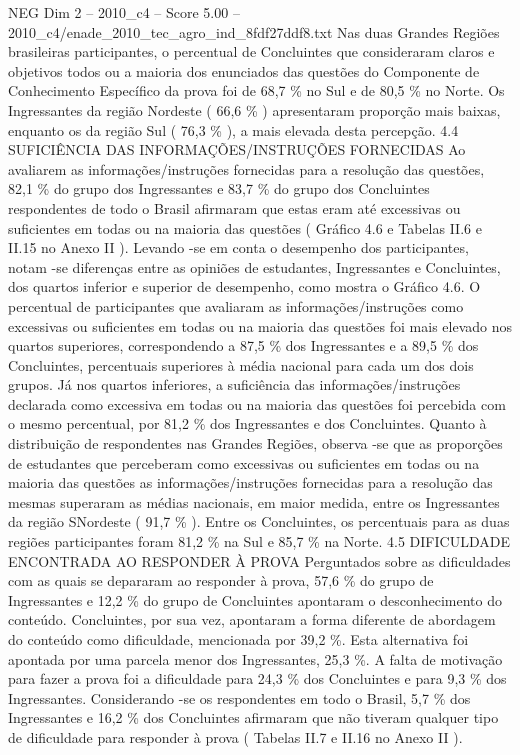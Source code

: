\begin{textsample}{NEG Dim 2 – 2010\_c4 – Score 5.00 – 2010\_c4/enade\_2010\_tec\_agro\_ind\_8fdf27ddf8.txt}
Nas duas Grandes Regiões brasileiras participantes, o percentual de Concluintes que consideraram claros e objetivos todos ou a maioria dos enunciados das questões do Componente de Conhecimento Específico da prova foi de 68,7 \% no Sul e de 80,5 \% no Norte.
Os Ingressantes da região Nordeste ( 66,6 \% ) apresentaram proporção mais baixas, enquanto os da região Sul ( 76,3 \% ), a mais elevada desta percepção. 4.4 SUFICIÊNCIA DAS INFORMAÇÕES/INSTRUÇÕES FORNECIDAS Ao avaliarem as informações/instruções fornecidas para a resolução das questões, 82,1 \% do grupo dos Ingressantes e 83,7 \% do grupo dos Concluintes respondentes de todo o Brasil afirmaram que estas eram até excessivas ou suficientes em todas ou na maioria das questões ( Gráfico 4.6 e Tabelas II.6 e II.15 no Anexo II ).
Levando -se em conta o desempenho dos participantes, notam -se diferenças entre as opiniões de estudantes, Ingressantes e Concluintes, dos quartos inferior e superior de desempenho, como mostra o Gráfico 4.6.
O percentual de participantes que avaliaram as informações/instruções como excessivas ou suficientes em todas ou na maioria das questões foi mais elevado nos quartos superiores, correspondendo a 87,5 \% dos Ingressantes e a 89,5 \% dos Concluintes, percentuais superiores à média nacional para cada um dos dois grupos.
Já nos quartos inferiores, a suficiência das informações/instruções declarada como excessiva em todas ou na maioria das questões foi percebida com o mesmo percentual, por 81,2 \% dos Ingressantes e dos Concluintes.
Quanto à distribuição de respondentes nas Grandes Regiões, observa -se que as proporções de estudantes que perceberam como excessivas ou suficientes em todas ou na maioria das questões as informações/instruções fornecidas para a resolução das mesmas superaram as médias nacionais, em maior medida, entre os Ingressantes da região SNordeste ( 91,7 \% ).
Entre os Concluintes, os percentuais para as duas regiões participantes foram 81,2 \% na Sul e 85,7 \% na Norte. 4.5 DIFICULDADE ENCONTRADA AO RESPONDER À PROVA Perguntados sobre as dificuldades com as quais se depararam ao responder à prova, 57,6 \% do grupo de Ingressantes e 12,2 \% do grupo de Concluintes apontaram o desconhecimento do conteúdo.
Concluintes, por sua vez, apontaram a forma diferente de abordagem do conteúdo como dificuldade, mencionada por 39,2 \%.
Esta alternativa foi apontada por uma parcela menor dos Ingressantes, 25,3 \%.
A falta de motivação para fazer a prova foi a dificuldade para 24,3 \% dos Concluintes e para 9,3 \% dos Ingressantes.
Considerando -se os respondentes em todo o Brasil, 5,7 \% dos Ingressantes e 16,2 \% dos Concluintes afirmaram que não tiveram qualquer tipo de dificuldade para responder à prova ( Tabelas II.7 e II.16 no Anexo II ).

\end{textsample}
